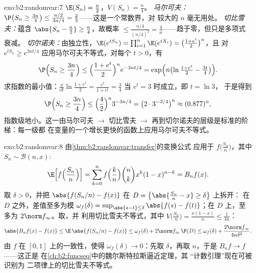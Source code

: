 \begin{solution}{exo:b2:randomvar:7}
$\E(S_n) = \frac n2$，$V(S_n) = \frac n4$。
\emph{马尔可夫：}$\P\bigl(S_n \geq \frac{3n}4\bigr) \leq
\frac{n/2}{3n/4} = \frac23$——这是一个常数界，对
较大的 $n$ 毫无用处。
\emph{切比雪夫：}蕴含 $\abs{S_n - \frac n2} \geq
\frac n4$，故概率 $\leq \frac{n/4}{(n/4)^2} =
\frac4n$——趋于零，但只是多项式衰减。
\emph{切尔诺夫：}由独立性，$\E(e^{tS_n}) =
\prod_{i=1}^n\E(e^{tX_i}) = \bigl(\frac{1 + e^t}{2}\bigr)^n$，且
对 $e^{tS_n} \geq e^{3nt/4}$ 应用马尔可夫不等式，对每个 $t >
0$，有
\[
\P\Bigl(S_n \geq \frac{3n}4\Bigr)
\leq \Bigl(\frac{1 + e^t}{2}\Bigr)^n e^{-3nt/4}
= \exp\Bigl(n\bigl(\ln\tfrac{1 + e^t}{2} - \tfrac{3t}4\bigr)\Bigr).
\]
求指数的最小值：$\frac{\dd}{\dd t}\ln\frac{1+e^t}{2} =
\frac{e^t}{1 + e^t} = \frac34$ 当 $e^t = 3$ 时成立，即 $t = \ln 3$，
于是得到
\[
\P\Bigl(S_n \geq \frac{3n}4\Bigr)
\leq \Bigl(\frac{4}{2}\Bigr)^n 3^{-3n/4}
= \bigl(2 \cdot 3^{-3/4}\bigr)^n \approx (0.877)^n ,
\]
指数级地小。这一由马尔可夫 $\to$ 切比雪夫 $\to$
再到切尔诺夫的层级是标准的阶梯：每一级都
在变量的一个增长更快的函数上应用马尔可夫不等式。
\end{solution}

\begin{solution}{exo:b2:randomvar:8}
由\cref{thm:b2:randomvar:transfer}的变换公式
应用于 $f\bigl(\frac{S_n}{n}\bigr)$，其中 $S_n \sim
\mathcal{B}(n, x)$:
\[
\E\Bigl[f\Bigl(\frac{S_n}{n}\Bigr)\Bigr]
= \sum_{k=0}^n f\Bigl(\frac kn\Bigr)\binom nk x^k(1-x)^{n-k}
= B_nf(x) .
\]
取 $\delta > 0$，并把 $\abs{f(S_n/n) - f(x)}$ 在 $D
= \bigl\{\abs{\frac{S_n}{n} - x} \geq \delta\bigr\}$ 上拆开：
在 $D$ 之外，差值至多为模
$\omega_f(\delta) = \sup_{\abs{s - t}\leq\delta}\abs{f(s) -
f(t)}$；在 $D$ 上，至多为 $2\norm f_\infty$。取，并
利用切比雪夫不等式，其中 $V\bigl(\frac{S_n}{n}\bigr) =
\frac{x(1-x)}{n} \leq \frac{1}{4n}$：
\[
\abs{B_nf(x) - f(x)}
\leq \E\,\abs{f(S_n/n) - f(x)}
\leq \omega_f(\delta)
+ 2\norm f_\infty\,\P(D)
\leq \omega_f(\delta) + \frac{2\norm f_\infty}{4n\delta^2} .
\]
由 $f$ 在 $[0, 1]$ 上的一致性，使得 $\omega_f(\delta) \to
0$：先取 $\delta$，再取 $n$，于是 $B_nf \to f$ ——这正是
在\cref{ch:b2:funcseq}中的魏尔斯特拉斯逼近定理，其
“计数引理”现在可被识别为
二项律上的切比雪夫不等式。
\end{solution}

